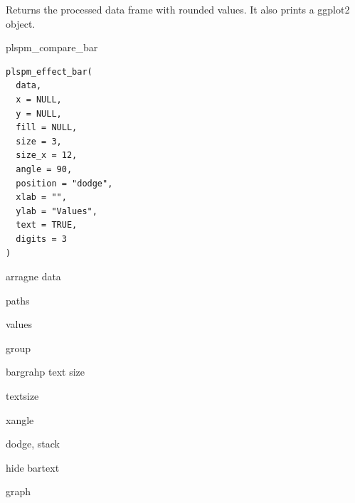 \documentclass[a4paper]{book}
\begin{document}
%
\begin{Value}
Returns the processed data frame with rounded values. It also prints a ggplot2 object.
\end{Value}
%
\begin{Examples}
\end{Examples}

%
\begin{Description}
plspm\_compare\_bar
\end{Description}
%
\begin{Usage}
\begin{verbatim}
plspm_effect_bar(
  data,
  x = NULL,
  y = NULL,
  fill = NULL,
  size = 3,
  size_x = 12,
  angle = 90,
  position = "dodge",
  xlab = "",
  ylab = "Values",
  text = TRUE,
  digits = 3
)
\end{verbatim}
\end{Usage}
%
\begin{Arguments}
\begin{ldescription}
\item[\code{data}] arragne data

\item[\code{x}] paths

\item[\code{y}] values

\item[\code{fill}] group

\item[\code{size}] bargrahp text size

\item[\code{size\_x}] textsize

\item[\code{angle}] xangle

\item[\code{position}] dodge, stack

\item[\code{text}] hide bartext
\end{ldescription}
\end{Arguments}
%
\begin{Value}
graph
\end{Value}
\end{document}
